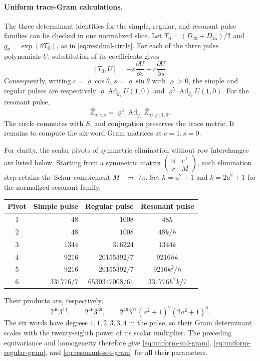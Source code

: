 \documentclass[11pt,a4paper]{article}
\newcommand{\Ad}{\operatorname{Ad}}
\begin{document}
\paragraph{Uniform trace-Gram calculations.}
The three determinant identities for the simple, regular, and resonant pulse
families can be checked in one normalized slice.  Let
$T_0=(D_{23}+D_{45})/2$ and $g_\theta=\exp(\theta T_0)$, as in
\eqref{eq:residual-circle}.  For each of the three pulse polynomials $U$,
substitution of its coefficients gives
\[
[T_0,U]=-s\frac{\partial U}{\partial c}
       +c\frac{\partial U}{\partial s}.
\]
Consequently, writing $c=\varrho\cos\theta$, $s=\varrho\sin\theta$ with
$\varrho>0$, the simple and regular pulses are respectively
$\varrho\Ad_{g_\theta}U(1,0)$ and
$\varrho^5\Ad_{g_\theta}U(1,0)$.  For the resonant pulse,
\[
\widehat Z_{a;c,s}
=\varrho^3\Ad_{g_\theta}\widehat Z_{a/\varrho;1,0}.
\]
The circle commutes with $S$, and conjugation preserves the trace metric.
It remains to compute the six-word Gram matrices at $c=1,s=0$.

For clarity, the scalar pivots of symmetric elimination without row
interchanges are listed below.  Starting from a symmetric matrix
$\left(\begin{smallmatrix}\pi&r^{\mathsf T}\\r&M\end{smallmatrix}\right)$,
each elimination step retains the Schur complement $M-rr^{\mathsf T}/\pi$.
Set $h=a^2+1$ and $k=2a^2+1$ for the normalized resonant family.
\begin{center}
\renewcommand{\arraystretch}{1.3}
\begin{tabular}{c r r c}
\toprule
Pivot & Simple pulse & Regular pulse & Resonant pulse\\
\midrule
$1$ & $48$ & $1008$ & $48h$\\
$2$ & $48$ & $1008$ & $48k/h$\\
$3$ & $1344$ & $316224$ & $1344k$\\
$4$ & $9216$ & $20155392/7$ & $9216hk$\\
$5$ & $9216$ & $20155392/7$ & $9216k^2/h$\\
$6$ & $331776/7$ & $6530347008/61$ & $331776h^2k/7$\\
\bottomrule
\end{tabular}
\end{center}
Their products are, respectively,
\[
2^{46}3^{11},\qquad 2^{46}3^{39},\qquad
2^{46}3^{11}(a^2+1)^2(2a^2+1)^6.
\]
The six words have degrees $1,1,2,3,3,4$ in the pulse, so their Gram
determinant scales with the twenty-eighth power of its scalar multiplier.
The preceding equivariance and homogeneity therefore give
\eqref{eq:uniform-so4-gram}, \eqref{eq:uniform-regular-gram}, and
\eqref{eq:resonant-so4-gram} for all their parameters.
\end{document}
